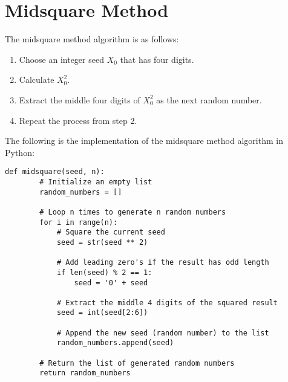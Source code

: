 \documentclass{article}
\begin{document}
\pagestyle{fancy}
\section{Midsquare Method}
The midsquare method algorithm is as follows:
\begin{enumerate}
    \item Choose an integer seed $X_0$ that has four digits.
    \item Calculate $X_0^2$.
    \item Extract the middle four digits of $X_0^2$ as the next random number.
    \item Repeat the process from step 2.
\end{enumerate}
The following is the implementation of the midsquare method algorithm in Python:
\begin{lstlisting}[style=standard,caption={Midsquare Method Algorithm in Python}]
    def midsquare(seed, n):
        # Initialize an empty list
        random_numbers = []

        # Loop n times to generate n random numbers
        for i in range(n):
            # Square the current seed
            seed = str(seed ** 2)

            # Add leading zero's if the result has odd length
            if len(seed) % 2 == 1:
                seed = '0' + seed

            # Extract the middle 4 digits of the squared result
            seed = int(seed[2:6])

            # Append the new seed (random number) to the list
            random_numbers.append(seed)

        # Return the list of generated random numbers
        return random_numbers
\end{lstlisting}
\end{document}
